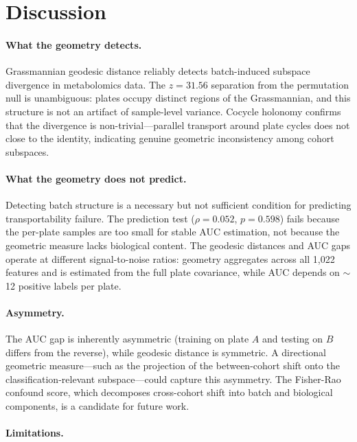\documentclass{article}
\begin{document}
\section{Discussion}
\label{sec:discussion}

\paragraph{What the geometry detects.} Grassmannian geodesic distance reliably detects batch-induced subspace divergence in metabolomics data. The $z = 31.56$ separation from the permutation null is unambiguous: plates occupy distinct regions of the Grassmannian, and this structure is not an artifact of sample-level variance. Cocycle holonomy confirms that the divergence is non-trivial---parallel transport around plate cycles does not close to the identity, indicating genuine geometric inconsistency among cohort subspaces.

\paragraph{What the geometry does not predict.} Detecting batch structure is a necessary but not sufficient condition for predicting transportability failure. The prediction test ($\rho = 0.052$, $p = 0.598$) fails because the per-plate samples are too small for stable AUC estimation, not because the geometric measure lacks biological content. The geodesic distances and AUC gaps operate at different signal-to-noise ratios: geometry aggregates across all 1{,}022 features and is estimated from the full plate covariance, while AUC depends on $\sim$12 positive labels per plate.

\paragraph{Asymmetry.} The AUC gap is inherently asymmetric (training on plate $A$ and testing on $B$ differs from the reverse), while geodesic distance is symmetric. A directional geometric measure---such as the projection of the between-cohort shift onto the classification-relevant subspace---could capture this asymmetry. The Fisher-Rao confound score, which decomposes cross-cohort shift into batch and biological components, is a candidate for future work.

\paragraph{Limitations.}
\end{document}
